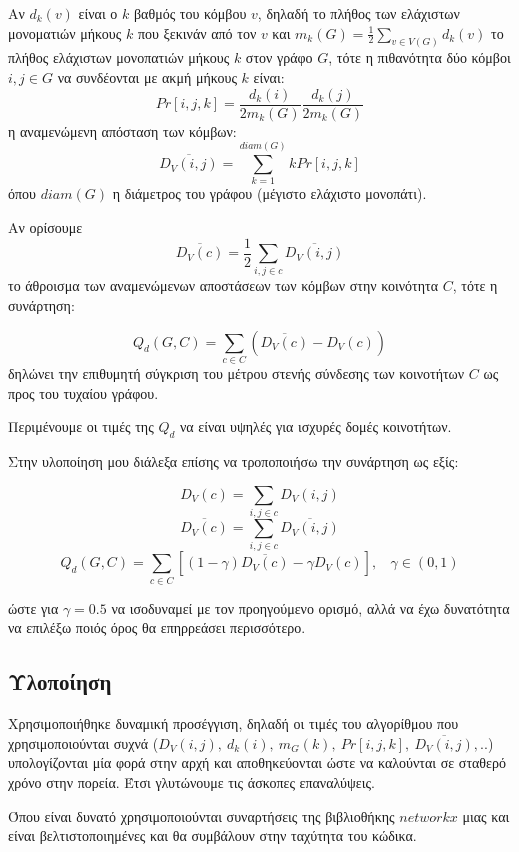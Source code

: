 \documentclass[12pt, letterpaper]{article}
\begin{document}
Αν $d_k(v)$ είναι ο $k$ βαθμός του κόμβου $v$, δηλαδή το πλήθος των 
ελάχιστων μονοματιών μήκους $k$ που ξεκινάν από τον $v$ και 
$m_k(G) = \frac{1}{2} \sum_{v \in V (G)} d_k(v)$ το πλήθος 
ελάχιστων μονοπατιών μήκους $k$ στον γράφο $G$, τότε η πιθανότητα δύο κόμβοι
$i,j \in G$ να συνδέονται με ακμή μήκους $k$ είναι:
\[ Pr[i,j,k] = \frac{d_k(i)}{2m_k(G)} \frac{d_k(j)}{2m_k(G)} \]
η αναμενώμενη απόσταση των κόμβων:
\[ \overline{D_V(i,j)} = \sum_{k=1}^{diam(G)} k Pr[i,j,k] \]
όπου $diam(G)$ η διάμετρος του γράφου (μέγιστο ελάχιστο μονοπάτι).

Αν ορίσουμε
\[ \overline{ D_V(c)  } = \frac{1}{2} \sum_{i,j \in c} \overline{ D_V(i,j) }\]
το άθροισμα των αναμενώμενων αποστάσεων των κόμβων στην κοινότητα $C$, 
τότε η συνάρτηση:

\[ Q_d(G,C) = \sum_{c \in C} (\overline{ D_V(c) } - D_V(c))\]
δηλώνει την επιθυμητή σύγκριση του μέτρου στενής σύνδεσης των κοινοτήτων 
$C$ ως προς του τυχαίου γράφου. 

Περιμένουμε οι τιμές της $Q_d$ να είναι υψηλές για ισχυρές δομές κοινοτήτων.


Στην υλοποίηση μου διάλεξα επίσης να τροποποιήσω την συνάρτηση ως εξίς:

\[ D_V(c) = \sum_{i,j \in c} D_V(i,j) \]
\[ \overline{ D_V(c)  } =  \sum_{i,j \in c} \overline{ D_V(i,j) }\]
\[ Q_d(G,C) = \sum_{c \in C} [(1 - \gamma)\overline{ D_V(c) } - \gamma D_V(c) ],  \ \ \ \ \gamma \in (0,1)\]

ώστε για $\gamma = 0.5$ να ισοδυναμεί με τον προηγούμενο ορισμό, αλλά να έχω 
δυνατότητα να επιλέξω ποιός όρος θα επηρρεάσει περισσότερο.



\subsection{Υλοποίηση}  \label{ylop}


Χρησιμοποιήθηκε δυναμική προσέγγιση, δηλαδή οι τιμές του αλγορίθμου που χρησιμοποιούνται 
συχνά ($D_V(i,j), \ d_k(i), \ m_G(k), \ Pr[i,j,k],  \ \overline{D_V(i,j)},..$)
υπολογίζονται μία φορά στην αρχή και αποθηκεύονται ώστε να καλούνται σε σταθερό χρόνο στην πορεία. Έτσι γλυτώνουμε τις 
άσκοπες επαναλύψεις. 

Όπου είναι δυνατό χρησιμοποιούνται συναρτήσεις της βιβλιοθήκης $networkx$ μιας και 
είναι βελτιστοποιημένες και θα συμβάλουν στην ταχύτητα του κώδικα.
\end{document}
